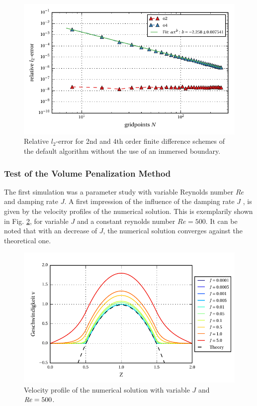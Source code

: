 \begin{figure}[!bp]
    \centering
    \includegraphics{gfx/immersed_boundary/poiseuille_flow/1_default/relative_l2error.pdf}
    \caption{Relative $l_2$-error for 2nd and 4th order finite difference schemes of the default algorithm without the use of an immersed boundary.\label{fig:ema1}}
\end{figure}

\clearpage


\subsubsection{Test of the Volume Penalization Method}

The first simulation was  a parameter study with variable Reynolds number $Re$ and damping rate $J$.
A first impression of the influence of the damping rate $J$ , is given by the velocity profiles of the numerical solution.
This is exemplarily shown in Fig. \ref{fig:vp_flow}, for variable $J$ and a constant reynolds number $Re=500$.
It can be noted that with an decrease of $J$, the numerical solution converges against the theoretical one.

\begin{figure}[!b]
  \centering
  \includegraphics{gfx/immersed_boundary/poiseuille_flow/2_vp/vp_profile.pdf}  \caption{\label{fig:vp_flow}
    Velocity profile of the numerical solution with variable $J$ and $\mbox{\textit{Re}} = 500$.}
\end{figure}

